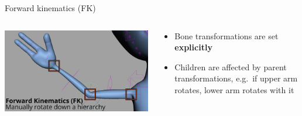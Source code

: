 \begin{frame}{Forward kinematics (FK)}
	\begin{columns}
		\begin{column}{0.4\textwidth}
			\includegraphics[width=\textwidth]{forward_kinematics}
		\end{column}
		\begin{column}{0.58\textwidth}
			\begin{itemize}
				\pause\item Bone transformations are set \textbf{explicitly}
				\pause\item Children are affected by parent transformations,
					e.g.\ if upper arm rotates, lower arm rotates with it
			\end{itemize}
		\end{column}
	\end{columns}
\end{frame}

